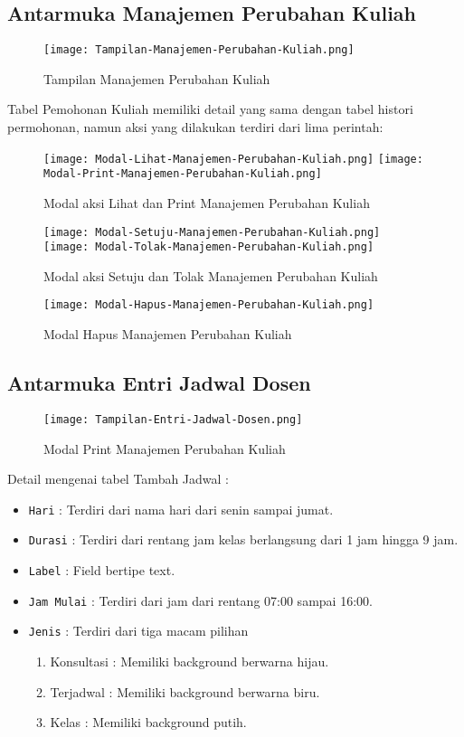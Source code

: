 \subsection{Antarmuka Manajemen Perubahan Kuliah}
\begin{figure} [H]
	\centering  
	\texttt{[image: Tampilan-Manajemen-Perubahan-Kuliah.png]}  
	\caption{Tampilan Manajemen Perubahan Kuliah} 
\end{figure}
Tabel Pemohonan Kuliah memiliki detail yang sama dengan tabel histori permohonan, namun aksi yang dilakukan terdiri dari lima perintah:
\begin{figure} [H]
	\centering  
	\texttt{[image: Modal-Lihat-Manajemen-Perubahan-Kuliah.png]}  
	\texttt{[image: Modal-Print-Manajemen-Perubahan-Kuliah.png]} 
	\caption{Modal aksi Lihat dan Print Manajemen Perubahan Kuliah} 
\end{figure}
\begin{figure} [H]
	\centering  
	\texttt{[image: Modal-Setuju-Manajemen-Perubahan-Kuliah.png]}
	\texttt{[image: Modal-Tolak-Manajemen-Perubahan-Kuliah.png]}    
	\caption{Modal aksi Setuju dan Tolak Manajemen Perubahan Kuliah} 
\end{figure}
\begin{figure} [H]
	\centering  
	\texttt{[image: Modal-Hapus-Manajemen-Perubahan-Kuliah.png]}  
	\caption{Modal Hapus Manajemen Perubahan Kuliah} 
\end{figure}

\subsection{Antarmuka Entri Jadwal Dosen}
\begin{figure} [H]
	\centering  
	\texttt{[image: Tampilan-Entri-Jadwal-Dosen.png]}  
	\caption{Modal Print Manajemen Perubahan Kuliah} 
\end{figure}
Detail mengenai tabel Tambah Jadwal :
\begin{itemize}
	\item \texttt{Hari} : Terdiri dari nama hari dari senin sampai jumat.
	\item \texttt{Durasi} : Terdiri dari rentang jam kelas berlangsung dari 1 jam hingga 9 jam.
	\item \texttt{Label} : Field bertipe text.
	\item \texttt{Jam Mulai} : Terdiri dari jam dari rentang 07:00 sampai 16:00.
	\item \texttt{Jenis} : Terdiri dari tiga macam pilihan 
	\begin{enumerate}
		\item Konsultasi : Memiliki background berwarna hijau.
		\item Terjadwal : Memiliki background berwarna biru.
		\item Kelas : Memiliki background putih.
	\end{enumerate}
\end{itemize}

